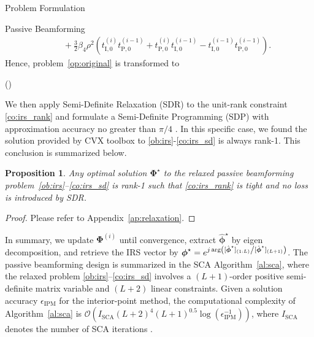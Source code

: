 \documentclass[journal,12pt,onecolumn,draftclsnofoot]{IEEEtran}
\newtheorem{proposition}{Proposition}
\begin{document}
\begin{section}{Problem Formulation}
\begin{subsection}{Passive Beamforming}
\begin{align}
				& \quad + \frac{3}{2}{\beta_4}{\rho^2} \left(t_{\mathrm{I},0}^{(i)} t_{\mathrm{P},0}^{(i-1)} + t_{\mathrm{P},0}^{(i)} t_{\mathrm{I},0}^{(i-1)} - t_{\mathrm{I},0}^{(i-1)} t_{\mathrm{P},0}^{(i-1)}\right).\label{eq:z_irs_approx}
			\end{align}
			Hence, problem~\eqref{op:original} is transformed to
			\begin{maxi!}
				{\scriptstyle{\boldsymbol{\Phi}}}{(\boldsymbol{\Phi})}{\label{op:irs}}{\label{ob:irs}}
				\label{co:irs_rate}
				\label{co:irs_modulus}
				\label{co:irs_sd}
			\end{maxi!}
			We then apply Semi-Definite Relaxation (SDR) to the unit-rank constraint \eqref{co:irs_rank} and formulate a Semi-Definite Programming (SDP) with approximation accuracy no greater than $\pi/4$ \cite{Luo2010}. In this specific case, we found the solution provided by CVX toolbox \cite{Grant2008} to \eqref{ob:irs}-\eqref{co:irs_sd} is always rank-\num{1}. This conclusion is summarized below.

			\begin{proposition}\label{pr:relaxation}
				Any optimal solution $\boldsymbol{\Phi}^\star$ to the relaxed passive beamforming problem~\eqref{ob:irs}--\eqref{co:irs_sd} is rank-\num{1} such that \eqref{co:irs_rank} is tight and no loss is introduced by SDR.
			\end{proposition}

			\begin{proof}\label{pf:relaxation}
				Please refer to Appendix~\ref{ap:relaxation}.
			\end{proof}

			In summary, we update $\boldsymbol{\Phi}^{(i)}$ until convergence, extract $\hat{\boldsymbol{\phi}}^\star$ by eigen decomposition, and retrieve the	IRS vector by $\boldsymbol{\phi}^{\star}=e^{j \arg\left([\hat{\boldsymbol{\phi}}^\star]_{(1:L)} \middle/ [\hat{\boldsymbol{\phi}}^\star]_{(L+1)}\right)}$. The passive beamforming design is summarized in the SCA Algorithm~\ref{al:sca}, where the relaxed problem \eqref{ob:irs}--\eqref{co:irs_sd} involves a $(L+1)$-order positive semi-definite matrix variable and $(L+2)$ linear constraints. Given a solution accuracy $\epsilon_{\mathrm{IPM}}$ for the interior-point method, the computational complexity of Algorithm~\ref{al:sca} is $\mathcal{O}\left(I_{\mathrm{SCA}}(L+2)^4 (L+1)^{0.5} \log(\epsilon_{\mathrm{IPM}}^{-1})\right)$, where $I_{\mathrm{SCA}}$ denotes the number of SCA iterations \cite{Luo2010}.


\end{subsection}
\end{section}
\end{document}
